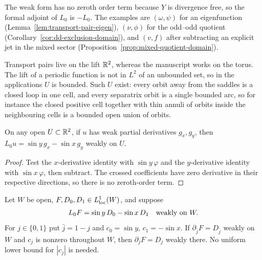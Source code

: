 \begin{remark}
The weak form has no zeroth order term because $Y$ is divergence free, so the
formal adjoint of $L_0$ is $-L_0$. The examples are $(\omega,\psi)$ for an
eigenfunction (Lemma~\ref{lem:transport-pair-eigen}), $(\nu,\phi)$ for the odd--odd
quotient (Corollary~\ref{cor:dd-exclusion-domain}), and $(v,f)$ after subtracting
an explicit jet in the mixed sector (Proposition~\ref{prop:mixed-quotient-domain}).

Transport pairs live on the lift $\mathbb{R}^2$, whereas the manuscript works on the
torus. The lift of a periodic function is not in $L^2$ of an unbounded set, so in
the applications $U$ is bounded. Such $U$ exist: every orbit away from the saddles
is a closed loop in one cell, and every separatrix orbit is a single bounded arc, so
for instance the closed positive cell together with thin annuli of orbits inside
the neighbouring cells is a bounded open union of orbits.
\end{remark}

\begin{lemma}
\label{lem:weak-gradient-transport}
\leanok
On any open $U\subset\mathbb{R}^2$, if $u$ has weak partial derivatives
$g_x,g_y$, then $L_0u=\sin y\,g_x-\sin x\,g_y$ weakly on $U$.
\end{lemma}

\begin{proof}
\leanok
Test the $x$-derivative identity with $\sin y\,\varphi$ and the
$y$-derivative identity with $\sin x\,\varphi$, then subtract.
The crossed coefficients have zero derivative in their respective
directions, so there is no zeroth-order term.
\end{proof}
\begin{lemma}
\label{lem:transport-transverse-partial}
\leanok
Let $W$ be open, $F,D_0,D_1\in L^1_{\rm loc}(W)$, and suppose
\[
 L_0F=\sin y\,D_0-\sin x\,D_1\quad\hbox{weakly on }W.
\]
For $j\in\{0,1\}$ put $\bar j=1-j$ and
$c_0=\sin y$, $c_1=-\sin x$.
If $\partial_{\bar j}F=D_{\bar j}$ weakly on $W$ and $c_j$ is nonzero
throughout $W$, then $\partial_jF=D_j$ weakly there.
No uniform lower bound for $|c_j|$ is needed.
\end{lemma}


